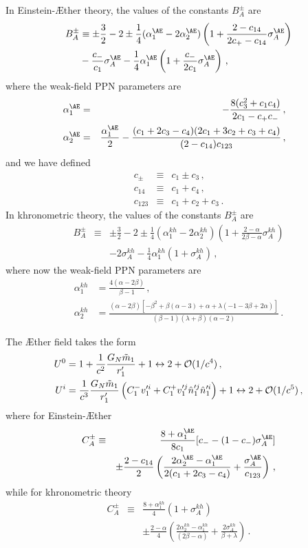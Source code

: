 \documentclass[prd,aps,twocolumn,nofootinbib,showpacs,superscriptaddress]{revtex4-1}
\newcommand\ba{\begin{eqnarray}}
\newcommand\ea{\end{eqnarray}}
\def\kh{{kh}}
\newcommand{\nn}{\nonumber}
\begin{document}
In Einstein-\AE ther theory, the values of the constants $B_{A}^{\pm}$ are
%
\allowdisplaybreaks
\begin{align}
\label{B-AE}
B^{\pm}_{A} &\equiv  \pm \frac{3}{2} -2 \pm \frac{1}{4} (\alpha^{\AE}_1 -
2\alpha^{\AE}_2) \left( 1 + \frac{2-c_{14}}{2 c_{+}-c_{14}}\sigma_{A}^{\AE} \right)
\nn \\ 
& - \frac{c_{-}}{c_1} \sigma_{A}^{\AE} - \frac{1}{4} \alpha^{\AE}_1 \left( 1+ \frac{c_{-}}{2 c_1} \sigma_{A}^{\AE} \right)\,, 
\end{align}
%
where the weak-field PPN parameters are 
%
\ba
\label{alpha1}
\hspace{-.3cm}\alpha^{\AE}_1 &=& -\frac{8(c_3^2+c_1c_4)}{2c_1-c_{+} c_{-}}\,, \\
\label{alpha2}
\hspace{-.3cm}\alpha^{\AE}_2 &=& \frac{\alpha^{\AE}_1}{2} - \frac{(c_1+2c_3-c_4)
  (2c_1+3c_2+c_3+c_4)}{(2-c_{14})c_{123}}\,,
  \ea
%
and we have defined
%
\ba
\label{cpm}
c_{\pm} &\equiv& c_{1} \pm c_{3}\,,
\\
c_{14} &\equiv& c_{1} + c_{4}\,,\label{c14}
\\
\label{c123}
c_{123} &\equiv& c_{1} + c_{2} + c_{3}\,.
\ea
%
In khronometric theory, the values of the constants $B^{\pm}_{A}$ are
%
\ba
\label{B-HL}
B^{\pm}_{A} & \equiv & \pm \frac{3}{2} -2 \pm \frac{1}{4} (\alpha^\kh_1 -
2\alpha^\kh_2) \left( 1 + \frac{2-\alpha}{2 \beta-\alpha} \sigma_{A}^\kh \right)
\nn \\ & & 
- 2 \sigma_{A}^\kh -\frac{1}{4} \alpha^\kh_1 (1 + \sigma_{A}^\kh)\,, 
\ea 
where now the weak-field PPN parameters are
\begin{align}
\label{alpha1-HL}
\alpha^\kh_1 &=  \frac{4(\alpha-2 \beta)}{\beta-1}\,,
\\ 
\label{alpha2-HL}
\alpha^\kh_2 &=
\frac{(\alpha-2\beta)[-\beta^2+\beta(\alpha-3)+\alpha+\lambda(-1-3\beta+2\alpha)]}{(\beta-1)(\lambda+\beta)(\alpha-2)}\,.
\end{align}

The \AE ther field takes the form
%
\begin{align}
\label{ut_AE}
U^{0} &= 1 + \frac{1}{c^2}\frac{G_{N} \tilde{m}_{1}}{r_{1}'} + 1 \leftrightarrow 2 + {\cal{O}}(1/c^{4})\,,
 \\\label{ui_AE}
U^{i} &= \frac{1}{c^3} \frac{G_{N} \tilde{m}_{1}}{r_{1}'} \left(C_{1}^{-}  v_{1}'^{i} + C_{1}^{+} v_{1}'^j \hat n_{1}'^{j} \hat n_{1}'^{i} \right)+ 1 \leftrightarrow 2 + {\cal{O}}(1/c^{5})\,,
\end{align}
%
where  for Einstein-\AE ther 
%
\ba
C^{\pm}_{A} & \equiv & \frac{8+\alpha^{\AE}_1}{8c_1} [ c_{-} - (1-c_{-})\sigma_{A}^{\AE} ]
\nn \\ & & \pm \frac{2-c_{14}}{2} \left( \frac{2\alpha^{\AE}_2-\alpha^{\AE}_1}{2
  (c_1+2c_3-c_4)} + \frac{\sigma_{A}^{\AE}}{c_{123}}  \right)\,, 
\ea
%
while for khronometric theory
\ba
C^{\pm}_{A} & \equiv & \frac{8+\alpha^{\kh}_1}{4} (1+\sigma_{A}^\kh)
\nn \\ & & \pm \frac{2-\alpha}{4} \left( \frac{2\alpha^{\kh}_2-\alpha^{\kh}_1}{
(2\beta-\alpha) } + \frac{2\sigma_{A}^\kh}{\beta+\lambda}  \right)\,. 
\ea
%
\end{document}

